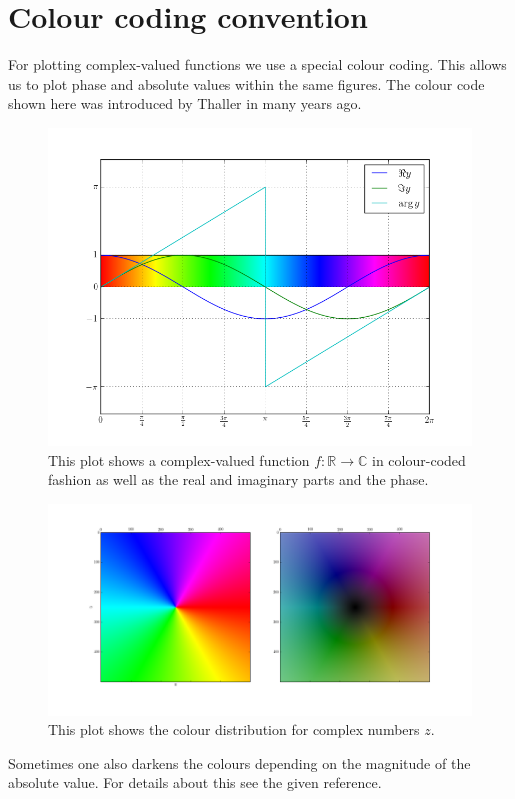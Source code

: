 \chapter{Colour coding convention}
\label{ch:color_code}


For plotting complex-valued functions we use a special colour coding.
This allows us to plot phase and absolute values within the same figures.
The colour code shown here was introduced by Thaller in \cite{Thaller_VQM}
many years ago.

\begin{figure}
  \centering
  \includegraphics[width=\linewidth]{./fig/color_legend.png}
  \caption{This plot shows a complex-valued function $f:\mathbb{R}\rightarrow\mathbb{C}$
           in colour-coded fashion as well as the real and imaginary parts and the phase.}
  \label{fig:color_legend}
\end{figure}


\begin{figure}
  \centering
  \includegraphics[width=\linewidth]{./fig/color_code.png}
  \caption{This plot shows the colour distribution for complex numbers $z$.}
  \label{fig:s}
\end{figure}

Sometimes one also darkens the colours depending on the magnitude of the
absolute value. For details about this see the given reference.

